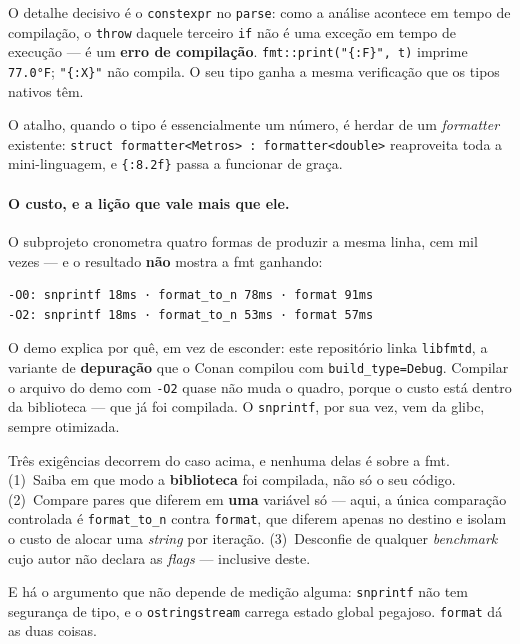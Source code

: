 O detalhe decisivo é o \texttt{constexpr} no \texttt{parse}: como a análise
acontece em tempo de compilação, o \texttt{throw} daquele terceiro \texttt{if}
não é uma exceção em tempo de execução --- é um \textbf{erro de compilação}.
\texttt{fmt::print("\{:F\}", t)} imprime \texttt{77.0°F}; \texttt{"\{:X\}"} não
compila. O seu tipo ganha a mesma verificação que os tipos nativos têm.

O atalho, quando o tipo é essencialmente um número, é herdar de um
\emph{formatter} existente: \texttt{struct formatter<Metros> :
formatter<double>} reaproveita toda a mini-linguagem, e \texttt{\{:8.2f\}}
passa a funcionar de graça.

\paragraph{O custo, e a lição que vale mais que ele.} O subprojeto cronometra
quatro formas de produzir a mesma linha, cem mil vezes --- e o resultado
\textbf{não} mostra a fmt ganhando:

\begin{lstlisting}[style=bt, language=bash,
    caption={Saída de \texttt{src/strings/}: 100\,000 formatações, nas duas
             configurações de compilação.}]
-O0: snprintf 18ms · format_to_n 78ms · format 91ms
-O2: snprintf 18ms · format_to_n 53ms · format 57ms
\end{lstlisting}

O demo explica por quê, em vez de esconder: este repositório linka
\texttt{libfmtd}, a variante de \textbf{depuração} que o Conan compilou com
\texttt{build\_type=Debug}. Compilar o arquivo do demo com \texttt{-O2} quase
não muda o quadro, porque o custo está dentro da biblioteca --- que já foi
compilada. O \texttt{snprintf}, por sua vez, vem da glibc, sempre otimizada.

\begin{regra}
Três exigências decorrem do caso acima, e nenhuma delas é sobre a fmt.
(1)~Saiba em que modo a \textbf{biblioteca} foi compilada, não só o seu código.
(2)~Compare pares que diferem em \textbf{uma} variável só --- aqui, a única
comparação controlada é \texttt{format\_to\_n} contra \texttt{format}, que
diferem apenas no destino e isolam o custo de alocar uma \emph{string} por
iteração. (3)~Desconfie de qualquer \emph{benchmark} cujo autor não declara as
\emph{flags} --- inclusive deste.
\end{regra}

E há o argumento que não depende de medição alguma: \texttt{snprintf} não tem
segurança de tipo, e o \texttt{ostringstream} carrega estado global pegajoso.
\texttt{format} dá as duas coisas.

